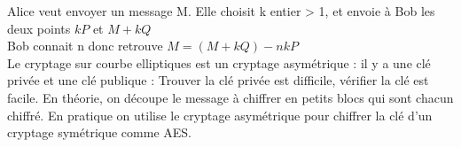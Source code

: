Alice veut envoyer un message M. Elle choisit k entier > 1, et envoie à Bob les deux points $kP$ et $M+kQ$ \\

Bob connait n donc retrouve $M = (M+kQ) - nkP$\\


Le cryptage sur courbe elliptiques est un cryptage asymétrique : il y a une clé privée et une clé publique : Trouver la clé privée est difficile, vérifier la clé est facile. 
En théorie, on découpe le message à chiffrer en petits blocs qui sont chacun chiffré.
En pratique on utilise le cryptage asymétrique pour chiffrer la clé d'un cryptage symétrique comme AES.
